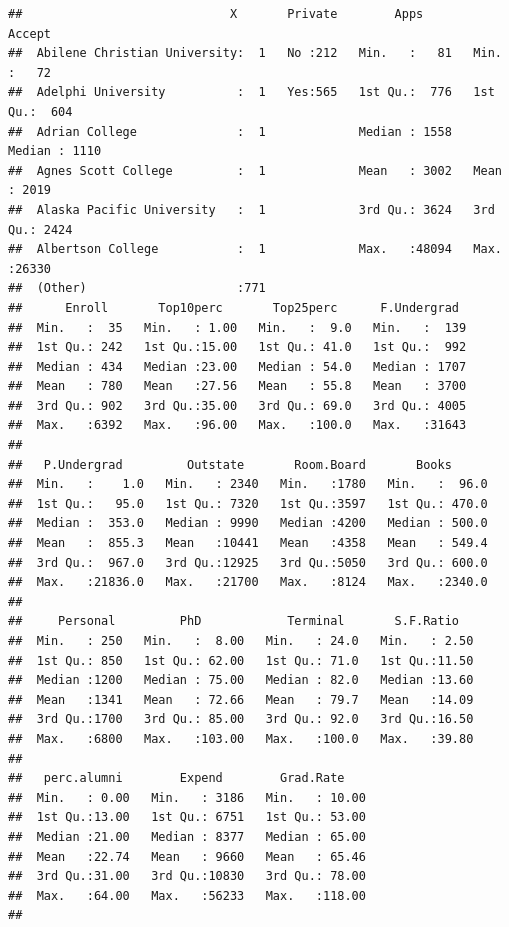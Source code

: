 \documentclass[]{article}
\begin{document}
\begin{verbatim}
##                             X       Private        Apps           Accept     
##  Abilene Christian University:  1   No :212   Min.   :   81   Min.   :   72  
##  Adelphi University          :  1   Yes:565   1st Qu.:  776   1st Qu.:  604  
##  Adrian College              :  1             Median : 1558   Median : 1110  
##  Agnes Scott College         :  1             Mean   : 3002   Mean   : 2019  
##  Alaska Pacific University   :  1             3rd Qu.: 3624   3rd Qu.: 2424  
##  Albertson College           :  1             Max.   :48094   Max.   :26330  
##  (Other)                     :771                                            
##      Enroll       Top10perc       Top25perc      F.Undergrad   
##  Min.   :  35   Min.   : 1.00   Min.   :  9.0   Min.   :  139  
##  1st Qu.: 242   1st Qu.:15.00   1st Qu.: 41.0   1st Qu.:  992  
##  Median : 434   Median :23.00   Median : 54.0   Median : 1707  
##  Mean   : 780   Mean   :27.56   Mean   : 55.8   Mean   : 3700  
##  3rd Qu.: 902   3rd Qu.:35.00   3rd Qu.: 69.0   3rd Qu.: 4005  
##  Max.   :6392   Max.   :96.00   Max.   :100.0   Max.   :31643  
##                                                                
##   P.Undergrad         Outstate       Room.Board       Books       
##  Min.   :    1.0   Min.   : 2340   Min.   :1780   Min.   :  96.0  
##  1st Qu.:   95.0   1st Qu.: 7320   1st Qu.:3597   1st Qu.: 470.0  
##  Median :  353.0   Median : 9990   Median :4200   Median : 500.0  
##  Mean   :  855.3   Mean   :10441   Mean   :4358   Mean   : 549.4  
##  3rd Qu.:  967.0   3rd Qu.:12925   3rd Qu.:5050   3rd Qu.: 600.0  
##  Max.   :21836.0   Max.   :21700   Max.   :8124   Max.   :2340.0  
##                                                                   
##     Personal         PhD            Terminal       S.F.Ratio    
##  Min.   : 250   Min.   :  8.00   Min.   : 24.0   Min.   : 2.50  
##  1st Qu.: 850   1st Qu.: 62.00   1st Qu.: 71.0   1st Qu.:11.50  
##  Median :1200   Median : 75.00   Median : 82.0   Median :13.60  
##  Mean   :1341   Mean   : 72.66   Mean   : 79.7   Mean   :14.09  
##  3rd Qu.:1700   3rd Qu.: 85.00   3rd Qu.: 92.0   3rd Qu.:16.50  
##  Max.   :6800   Max.   :103.00   Max.   :100.0   Max.   :39.80  
##                                                                 
##   perc.alumni        Expend        Grad.Rate     
##  Min.   : 0.00   Min.   : 3186   Min.   : 10.00  
##  1st Qu.:13.00   1st Qu.: 6751   1st Qu.: 53.00  
##  Median :21.00   Median : 8377   Median : 65.00  
##  Mean   :22.74   Mean   : 9660   Mean   : 65.46  
##  3rd Qu.:31.00   3rd Qu.:10830   3rd Qu.: 78.00  
##  Max.   :64.00   Max.   :56233   Max.   :118.00  
## 
\end{verbatim}
\end{document}
